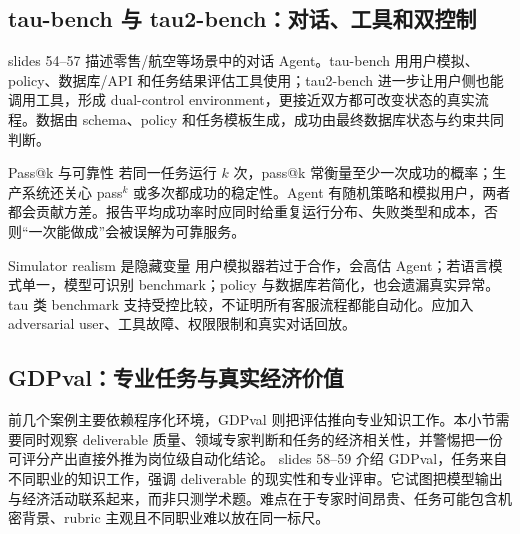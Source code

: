 \subsection{tau-bench 与 tau2-bench：对话、工具和双控制}

slides 54--57 描述零售/航空等场景中的对话 Agent。tau-bench 用用户模拟、policy、数据库/API 和任务结果评估工具使用；tau2-bench 进一步让用户侧也能调用工具，形成 dual-control environment，更接近双方都可改变状态的真实流程。数据由 schema、policy 和任务模板生成，成功由最终数据库状态与约束共同判断。


\begin{knowledgebox}{Pass@k 与可靠性}
若同一任务运行 $k$ 次，pass@k 常衡量至少一次成功的概率；生产系统还关心 pass$^k$ 或多次都成功的稳定性。Agent 有随机策略和模拟用户，两者都会贡献方差。报告平均成功率时应同时给重复运行分布、失败类型和成本，否则“一次能做成”会被误解为可靠服务。
\end{knowledgebox}

\begin{warningbox}{Simulator realism 是隐藏变量}
用户模拟器若过于合作，会高估 Agent；若语言模式单一，模型可识别 benchmark；policy 与数据库若简化，也会遗漏真实异常。tau 类 benchmark 支持受控比较，不证明所有客服流程都能自动化。应加入 adversarial user、工具故障、权限限制和真实对话回放。
\end{warningbox}

\subsection{GDPval：专业任务与真实经济价值}

前几个案例主要依赖程序化环境，GDPval 则把评估推向专业知识工作。本小节需要同时观察 deliverable 质量、领域专家判断和任务的经济相关性，并警惕把一份可评分产出直接外推为岗位级自动化结论。
slides 58--59 介绍 GDPval，任务来自不同职业的知识工作，强调 deliverable 的现实性和专业评审。它试图把模型输出与经济活动联系起来，而非只测学术题。难点在于专家时间昂贵、任务可能包含机密背景、rubric 主观且不同职业难以放在同一标尺。


